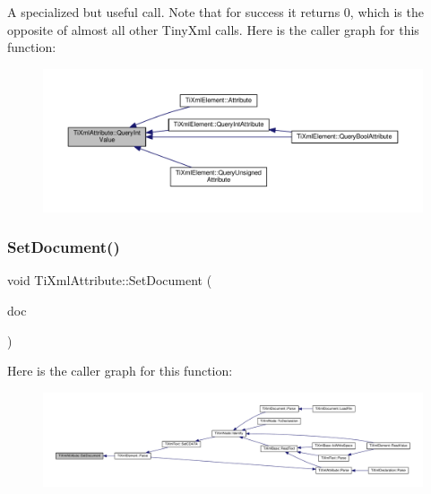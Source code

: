 A specialized but useful call. Note that for success it returns 0, which is the opposite of almost all other Tiny\+Xml calls. Here is the caller graph for this function\+:\nopagebreak
\begin{figure}[H]
\begin{center}
\leavevmode
\includegraphics[width=350pt]{class_ti_xml_attribute_a6caa8090d2fbb7966700a16e45ed33de_icgraph}
\end{center}
\end{figure}
\mbox{\label{class_ti_xml_attribute_ac12a94d4548302afb12f488ba101f7d1}} 
\subsubsection{\texorpdfstring{Set\+Document()}{SetDocument()}}
{\footnotesize\ttfamily void Ti\+Xml\+Attribute\+::\+Set\+Document (\begin{DoxyParamCaption}\item[{\hyperlink{class_ti_xml_document}{Ti\+Xml\+Document} $\ast$}]{doc }\end{DoxyParamCaption})\hspace{0.3cm}{\ttfamily [inline]}}

Here is the caller graph for this function\+:\nopagebreak
\begin{figure}[H]
\begin{center}
\leavevmode
\includegraphics[width=350pt]{class_ti_xml_attribute_ac12a94d4548302afb12f488ba101f7d1_icgraph}
\end{center}
\end{figure}
\mbox{\label{class_ti_xml_attribute_a0316da31373496c4368ad549bf711394}} 
